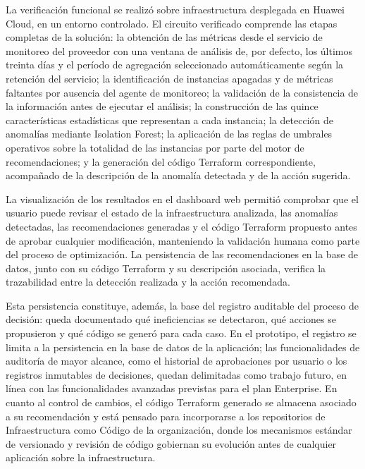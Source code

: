 La verificación funcional se realizó sobre infraestructura desplegada en Huawei Cloud, en un entorno controlado. El circuito verificado comprende las etapas completas de la solución: la obtención de las métricas desde el servicio de monitoreo del proveedor con una ventana de análisis de, por defecto, los últimos treinta días y el período de agregación seleccionado automáticamente según la retención del servicio; la identificación de instancias apagadas y de métricas faltantes por ausencia del agente de monitoreo; la validación de la consistencia de la información antes de ejecutar el análisis; la construcción de las quince características estadísticas que representan a cada instancia; la detección de anomalías mediante Isolation Forest; la aplicación de las reglas de umbrales operativos sobre la totalidad de las instancias por parte del motor de recomendaciones; y la generación del código Terraform correspondiente, acompañado de la descripción de la anomalía detectada y de la acción sugerida.

La visualización de los resultados en el dashboard web permitió comprobar que el usuario puede revisar el estado de la infraestructura analizada, las anomalías detectadas, las recomendaciones generadas y el código Terraform propuesto antes de aprobar cualquier modificación, manteniendo la validación humana como parte del proceso de optimización. La persistencia de las recomendaciones en la base de datos, junto con su código Terraform y su descripción asociada, verifica la trazabilidad entre la detección realizada y la acción recomendada.

Esta persistencia constituye, además, la base del registro auditable del proceso de decisión: queda documentado qué ineficiencias se detectaron, qué acciones se propusieron y qué código se generó para cada caso. En el prototipo, el registro se limita a la persistencia en la base de datos de la aplicación; las funcionalidades de auditoría de mayor alcance, como el historial de aprobaciones por usuario o los registros inmutables de decisiones, quedan delimitadas como trabajo futuro, en línea con las funcionalidades avanzadas previstas para el plan Enterprise. En cuanto al control de cambios, el código Terraform generado se almacena asociado a su recomendación y está pensado para incorporarse a los repositorios de Infraestructura como Código de la organización, donde los mecanismos estándar de versionado y revisión de código gobiernan su evolución antes de cualquier aplicación sobre la infraestructura.

